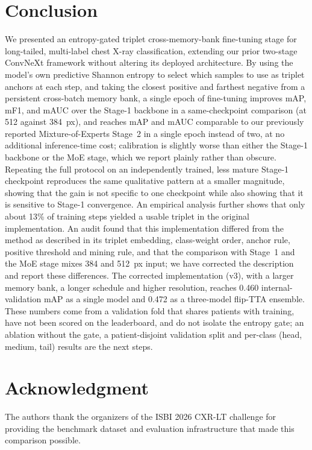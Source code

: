 \documentclass[conference]{IEEEtran}
\begin{document}
\section{Conclusion}
We presented an entropy-gated triplet cross-memory-bank fine-tuning stage for long-tailed, multi-label chest X-ray classification, extending our prior two-stage ConvNeXt framework without altering its deployed architecture. By using the model's own predictive Shannon entropy to select which samples to use as triplet anchors at each step, and taking the closest positive and farthest negative from a persistent cross-batch memory bank, a single epoch of fine-tuning improves mAP, mF1, and mAUC over the Stage-1 backbone in a same-checkpoint comparison (at 512 against 384~px), and reaches mAP and mAUC comparable to our previously reported Mixture-of-Experts Stage~2 in a single epoch instead of two, at no additional inference-time cost; calibration is slightly worse than either the Stage-1 backbone or the MoE stage, which we report plainly rather than obscure. Repeating the full protocol on an independently trained, less mature Stage-1 checkpoint reproduces the same qualitative pattern at a smaller magnitude, showing that the gain is not specific to one checkpoint while also showing that it is sensitive to Stage-1 convergence. An empirical analysis further shows that only about 13\% of training steps yielded a usable triplet in the original implementation. An audit found that this implementation differed from the method as described in its triplet embedding, class-weight order, anchor rule, positive threshold and mining rule, and that the comparison with Stage~1 and the MoE stage mixes 384 and 512~px input; we have corrected the description and report these differences. The corrected implementation (v3), with a larger memory bank, a longer schedule and higher resolution, reaches 0.460 internal-validation mAP as a single model and 0.472 as a three-model flip-TTA ensemble. These numbers come from a validation fold that shares patients with training, have not been scored on the leaderboard, and do not isolate the entropy gate; an ablation without the gate, a patient-disjoint validation split and per-class (head, medium, tail) results are the next steps.

\section*{Acknowledgment}
The authors thank the organizers of the ISBI 2026 CXR-LT challenge for providing the benchmark dataset and evaluation infrastructure that made this comparison possible.
\end{document}
